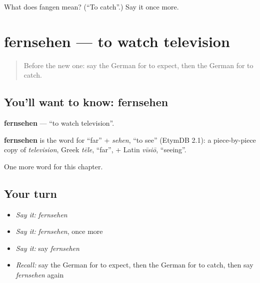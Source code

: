 \begin{tcolorbox}[breakable,colback=teal!4,colframe=teal!35!black,title={Before you move on}]
What does fangen mean? (\textquotedblleft{}To catch\textquotedblright{}.) Say it once more.
\end{tcolorbox}
\section[fernsehen]{fernsehen — to watch television}

\label{lesson:GE-C180-fernsehen}



\begin{quote}
Before the new one: say the German for to expect, then the German for to catch.
\end{quote}

\subsection*{You'll want to know: fernsehen}
\textbf{fernsehen} — \textquotedblleft{}to watch television\textquotedblright{}.

\begin{cousinweb}
\textbf{fernsehen} is the word for \textquotedblleft{}far\textquotedblright{} + \emph{sehen}, \textquotedblleft{}to see\textquotedblright{} (EtymDB 2.1): a piece-by-piece copy of \emph{television}, Greek \emph{tēle}, \textquotedblleft{}far\textquotedblright{}, + Latin \emph{vīsiō}, \textquotedblleft{}seeing\textquotedblright{}.
\end{cousinweb}

\begin{grammarlens}[title={What you've built}]
One more word for this chapter.
\end{grammarlens}

\subsection*{Your turn}
\begin{itemize}
\raggedright
  \item \emph{Say it:} \emph{fernsehen}
  \item \emph{Say it:} \emph{fernsehen}, once more
  \item \emph{Say it:} say \emph{fernsehen}
  \item \emph{Recall:} say the German for to expect, then the German for to catch, then say \emph{fernsehen} again
\end{itemize}

